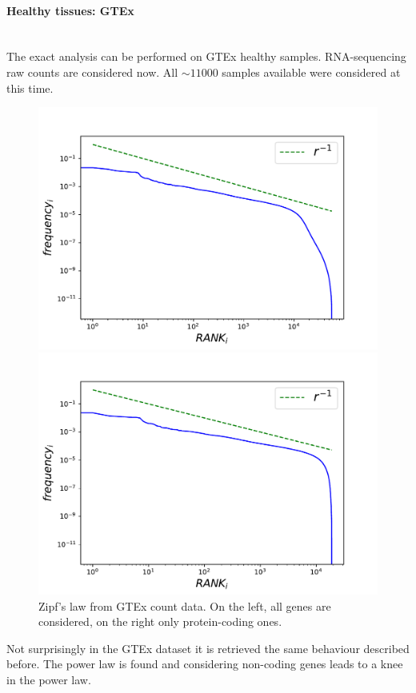 \paragraph{Healthy tissues: GTEx}\mbox{} \\
The exact analysis can be performed on GTEx healthy samples. RNA-sequencing raw counts are considered now. All $\sim11000$ samples available were considered at this time.
\begin{figure}[htb!]
    \centering
    \begin{minipage}{0.45\textwidth}
    \includegraphics[width=0.95\linewidth]{pictures/structure/gtex/globalZipf.pdf}
    \end{minipage}
    \hspace{2mm}
    \begin{minipage}{0.45\textwidth}
    \includegraphics[width=0.95\linewidth]{pictures/structure/gtex/globalZipf_c.pdf}
    \end{minipage}
    \caption{Zipf's law from GTEx count data. On the left, all genes are considered, on the right only protein-coding ones.}
    \label{fig:my_label}
\end{figure}
Not surprisingly in the GTEx dataset it is retrieved the same behaviour described before. The power law is found and considering non-coding genes leads to a knee in the power law.

